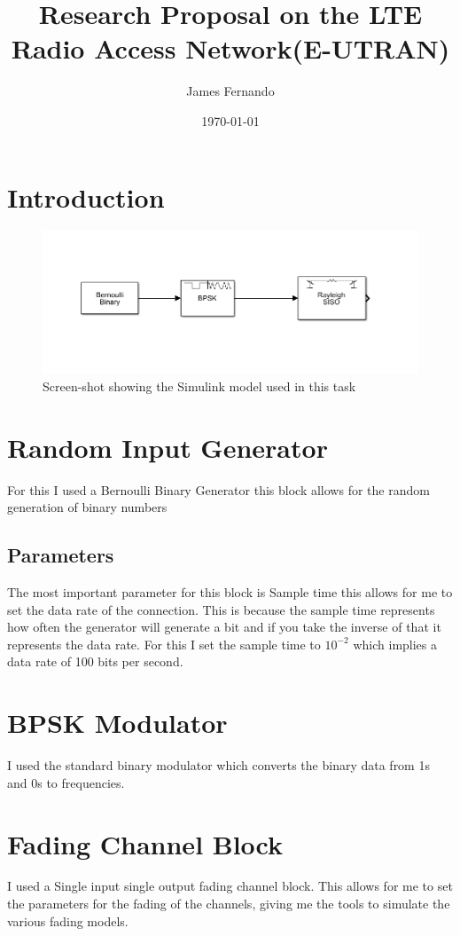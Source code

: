 \documentclass[a4paper,12pt]{scrartcl}
\title{Research Proposal on the LTE Radio Access Network(E-UTRAN)}
\author{James Fernando}
\date{\today}
\begin{document}
	
	\begin{titlepage}
		\maketitle
	\end{titlepage}
	
	\tableofcontents
	\newpage	
{
	\section{Introduction}{
		\begin{figure}
			\centering
			\includegraphics[width=\textwidth]{SimulinkModel}
			\caption{Screen-shot showing the Simulink model used in this task}
			\label{img:SimulinkModel}
		\end{figure}
	}
	\section{Random Input Generator}
	{
		For this I used a Bernoulli Binary Generator this block allows for the random generation of binary numbers
		\subsection{Parameters}
		{
			The most important parameter for this block is Sample time this allows for me to set the data rate of the connection. This is because the sample time represents how often the generator will generate a bit and if you take the inverse of that it represents the data rate. For this I set the sample time to $10^{-2}$ which implies a data rate of 100 bits per second.
		}
	}
	\section{BPSK Modulator}
	{
		I used the standard binary modulator which converts the binary data from 1s and 0s to frequencies.
	}
	\section{Fading Channel Block}
	{
		I used a Single input single output fading channel block. This allows for me to set the parameters for the fading of the channels, giving me the tools to simulate the various fading models.
}}
\end{document}

